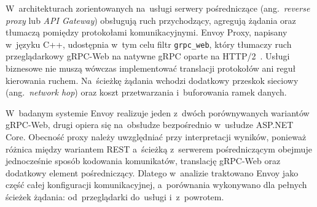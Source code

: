 W~architekturach zorientowanych na~usługi serwery pośredniczące (ang.\ \textit{reverse proxy} lub \textit{API Gateway}) obsługują ruch przychodzący, agregują żądania oraz tłumaczą pomiędzy protokołami komunikacyjnymi. Envoy Proxy, napisany w~języku C++, udostępnia w~tym celu filtr \texttt{grpc\_web}, który tłumaczy ruch przeglądarkowy gRPC-Web na natywne gRPC oparte na HTTP/2~\cite{bib:EnvoyProxy}. Usługi biznesowe nie muszą wówczas implementować translacji protokołów ani reguł kierowania ruchem. Na~ścieżkę żądania wchodzi dodatkowy przeskok sieciowy (ang.\ \textit{network hop}) oraz koszt przetwarzania i~buforowania ramek danych.

W~badanym systemie Envoy realizuje jeden z~dwóch porównywanych wariantów gRPC-Web, drugi opiera się na~obsłudze bezpośrednio w~usłudze ASP.NET Core. Obecność proxy należy uwzględniać przy interpretacji wyników, ponieważ różnica między wariantem REST a~ścieżką z~serwerem pośredniczącym obejmuje jednocześnie sposób kodowania komunikatów, translację gRPC-Web oraz dodatkowy element pośredniczący. Dlatego w~analizie traktowano Envoy jako część całej konfiguracji komunikacyjnej, a~porównania wykonywano dla pełnych ścieżek żądania: od~przeglądarki do~usługi i~z~powrotem.
